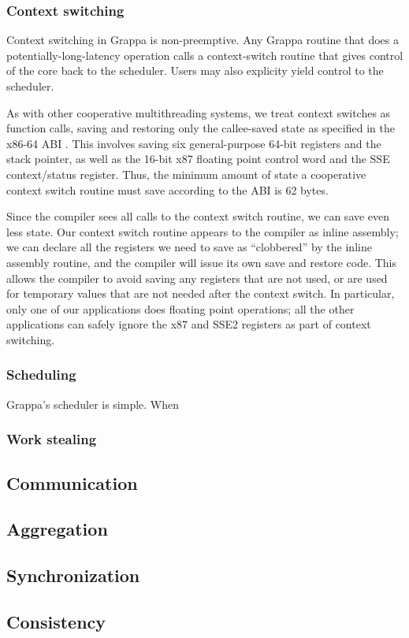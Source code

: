 \subsubsection{Context switching}

Context switching in Grappa is non-preemptive. Any Grappa routine that
does a potentially-long-latency operation calls a context-switch
routine that gives control of the core back to the scheduler. Users
may also explicity yield control to the scheduler.

As with other cooperative multithreading systems, we treat context
switches as function calls, saving and restoring only the callee-saved
state as specified in the x86-64 ABI . This involves saving
six general-purpose 64-bit registers and the stack pointer, as well as
the 16-bit x87 floating point control word and the SSE context/status
register. Thus, the minimum amount of state a cooperative context
switch routine must save according to the ABI is 62 bytes.

Since the compiler sees all calls to the context switch routine, we
can save even less state. Our context switch routine appears to the
compiler as inline assembly; we can declare all the registers we need
to save as ``clobbered'' by the inline assembly routine, and the
compiler will issue its own save and restore code. This allows the
compiler to avoid saving any registers that are not used, or are used
for temporary values that are not needed after the context switch. In
particular, only one of our applications does floating point
operations; all the other applications can safely ignore the x87 and
SSE2 registers as part of context switching.

\subsubsection{Scheduling}

Grappa's scheduler is simple. When 

\subsubsection{Work stealing}

\subsection{Communication}


\subsection{Aggregation}

\subsection{Synchronization}

\subsection{Consistency}
